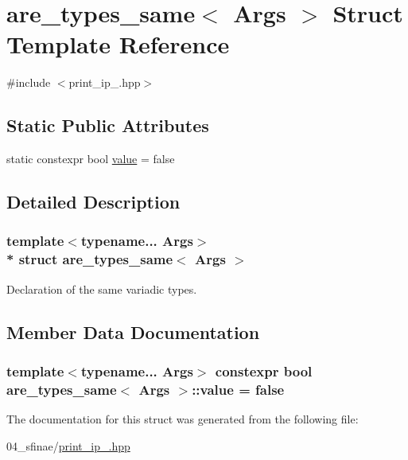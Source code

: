\hypertarget{structare__types__same}{}\section{are\+\_\+types\+\_\+same$<$ Args $>$ Struct Template Reference}
\label{structare__types__same}


{\ttfamily \#include $<$print\+\_\+ip\+\_.\+hpp$>$}

\subsection*{Static Public Attributes}
\begin{DoxyCompactItemize}
\item 
static constexpr bool \hyperlink{structare__types__same_a48db931dc4df3584206bdf337011441b}{value} = false
\end{DoxyCompactItemize}


\subsection{Detailed Description}
\subsubsection*{template$<$typename... Args$>$\\*
struct are\+\_\+types\+\_\+same$<$ Args $>$}

Declaration of the same variadic types. 

\subsection{Member Data Documentation}
\subsubsection[{\texorpdfstring{value}{value}}]{\setlength{\rightskip}{0pt plus 5cm}template$<$typename... Args$>$ constexpr bool {\bf are\+\_\+types\+\_\+same}$<$ Args $>$\+::value = false\hspace{0.3cm}{\ttfamily [static]}}\hypertarget{structare__types__same_a48db931dc4df3584206bdf337011441b}{}\label{structare__types__same_a48db931dc4df3584206bdf337011441b}


The documentation for this struct was generated from the following file\+:\begin{DoxyCompactItemize}
\item 
04\+\_\+sfinae/\hyperlink{print__ip__04_8hpp}{print\+\_\+ip\+\_.\+hpp}\end{DoxyCompactItemize}
